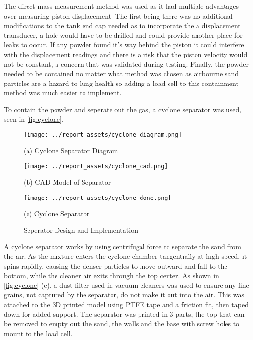 The direct mass measurement method was used as it had multiple advantages over measuring piston displacement. The first being there was no additional modifications to the tank end cap needed as to incorporate the a displacement transducer, a hole would have to be drilled and could provide another place for leaks to occur. If any powder found it's way behind the piston it could interfere with the displacement readings and there is a risk that the piston velocity would not be constant, a concern that was validated during testing. Finally, the powder needed to be contained no matter what method was chosen as airbourne sand particles are a hazard to lung health so adding a load cell to this containment method was much easier to implement.

To contain the powder and seperate out the gas, a cyclone separator was used, seen in \autoref{fig:cyclone}.
\begin{figure}[htbp]
    \centering

    \begin{minipage}{0.3\textwidth}
        \centering
        \texttt{[image: ../report\_assets/cyclone\_diagram.png]}
        \caption*{(a) Cyclone Separator Diagram}
    \end{minipage}
    \hfill
    \begin{minipage}{0.3\textwidth}
        \centering
        \texttt{[image: ../report\_assets/cyclone\_cad.png]}
        \caption*{(b) CAD Model of Separator}
    \end{minipage}
    \hfill
    \begin{minipage}{0.3\textwidth}
        \centering
        \texttt{[image: ../report\_assets/cyclone\_done.png]}
        \caption*{(c) Cyclone Separator}
    \end{minipage}
    \caption{Seperator Design and Implementation}\label{fig:cyclone}
\end{figure}
A cyclone separator works by using centrifugal force to separate the sand from the air. As the mixture enters the cyclone chamber tangentially at high speed, it spins rapidly, causing the denser particles to move outward and fall to the bottom, while the cleaner air exits through the top center. As shown in \autoref{fig:cyclone} (c), a dust filter used in vacuum cleaners was used to ensure any fine grains, not captured by the separator, do not make it out into the air. This was attached to the 3D printed model using PTFE tape and a friction fit, then taped down for added support. The separator was printed in 3 parts, the top that can be removed to empty out the sand, the walls and the base with screw holes to mount to the load cell.

